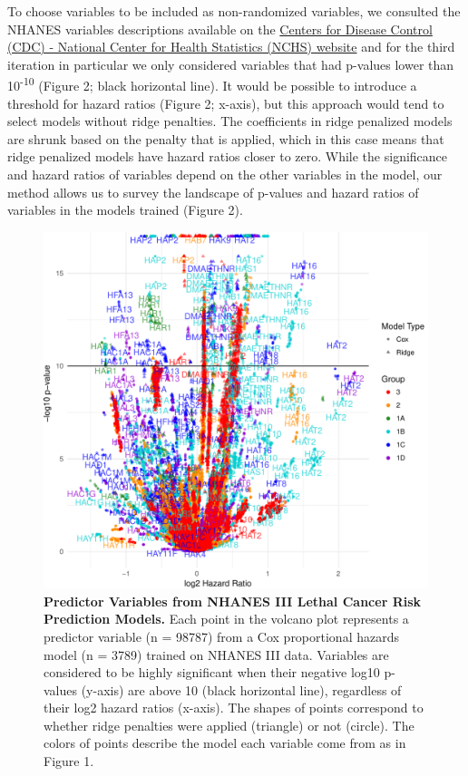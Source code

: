 \documentclass[12pt,oneside]{reedthesis}
\theoremstyle{definition}
\theoremstyle{definition}
\theoremstyle{definition}
\theoremstyle{remark}
\begin{document}
To choose variables to be included as non-randomized variables, we
consulted the NHANES variables descriptions available on the
\href{https://wwwn.cdc.gov/nchs/nhanes/nhanes3/DataFiles.aspx}{Centers
for Disease Control (CDC) - National Center for Health Statistics (NCHS)
website} and for the third iteration in particular we only considered
variables that had p-values lower than 10\textsuperscript{-10} (Figure
2; black horizontal line). It would be possible to introduce a threshold
for hazard ratios (Figure 2; x-axis), but this approach would tend to
select models without ridge penalties. The coefficients in ridge
penalized models are shrunk based on the penalty that is applied, which
in this case means that ridge penalized models have hazard ratios closer
to zero. While the significance and hazard ratios of variables depend on
the other variables in the model, our method allows us to survey the
landscape of p-values and hazard ratios of variables in the models
trained (Figure 2).
\begin{figure}
\centering
\includegraphics[width=\textwidth,height=0.6\textheight]{figure/2-volcano-final.pdf}
\caption{\textbf{Predictor Variables from NHANES III Lethal Cancer Risk
Prediction Models.} Each point in the volcano plot represents a
predictor variable (n = 98787) from a Cox proportional hazards model (n
= 3789) trained on NHANES III data. Variables are considered to be
highly significant when their negative log10 p-values (y-axis) are above
10 (black horizontal line), regardless of their log2 hazard ratios
(x-axis). The shapes of points correspond to whether ridge penalties
were applied (triangle) or not (circle). The colors of points describe
the model each variable come from as in Figure 1.}
\end{figure}
\end{document}
